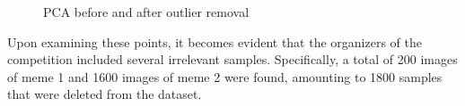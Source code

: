 \documentclass[10pt]{article}
\begin{document}
\begin{multicols}{2}
        \begin{figure}[H]
        \centering
        \caption{PCA before and after outlier removal}
        \label{fig:fig1}
        \end{figure}
        
        Upon examining these points, it becomes evident that the organizers of the competition included several irrelevant samples. Specifically, a total of 200 images of meme 1 and 1600 images of meme 2 were found, amounting to 1800  samples that were deleted from the dataset. %

        


        

\end{multicols}
\end{document}
